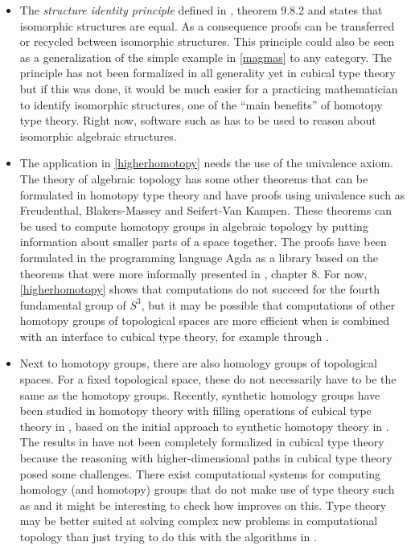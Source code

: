 \documentclass[12pt,a4paper,twoside,xetex]{book}
\newcommand{\keyword}[1]{\emph{#1}\index{#1}}
\begin{document}
\begin{itemize}
\item The \keyword{structure identity principle} defined in 
\cite{Voevodsky2013}, theorem 9.8.2 and \cite{Aczel2012} states that isomorphic 
structures are equal. As a consequence proofs can be transferred or recycled 
between isomorphic structures. This principle could also be seen as a 
generalization of the simple example in \cref{magmas} to any category. The 
principle has not been formalized in all generality yet in cubical type theory 
but if this was done, it would be much easier for a practicing mathematician to 
identify isomorphic structures, one of the ``main benefits'' of homotopy type 
theory. Right now, software such as \cite{TheGAPGroup2018} has to be used to 
reason about isomorphic algebraic structures.

\item The application in \cref{higherhomotopy} needs the use of the univalence 
axiom. The theory of algebraic topology has some other theorems that can be 
formulated in homotopy type theory and have proofs using univalence such as 
Freudenthal, Blakers-Massey and Seifert-Van Kampen. These theorems can be used 
to compute homotopy groups in algebraic topology by putting information about 
smaller parts of a space together. The proofs have been formulated in the 
programming language Agda as a library \cite{HoBr17} based on the theorems that 
were more informally presented in \cite{Voevodsky2013}, chapter 8. For now, 
\cref{higherhomotopy} shows that computations do not succeed for the fourth 
fundamental group of $S^3$, but it may be possible that computations of other 
homotopy groups of topological spaces are more efficient when \cite{HoBr17} is 
combined with an interface to cubical type theory, for example through 
\cite{Moertberg2018}.


\item Next to homotopy groups, there are also homology groups of topological 
spaces. For a fixed topological space, these do not necessarily have to be the 
same as the homotopy groups. Recently, synthetic homology groups have  been 
studied in homotopy theory with filling operations of cubical type theory in 
\cite{Graham2018}, based on the initial approach to synthetic homotopy theory in 
\cite{Licata2015}. The results in \cite{Graham2018} have not been completely 
formalized in cubical type theory because the reasoning with higher-dimensional 
paths in cubical type theory posed some challenges. There exist computational 
systems for computing homology  (and homotopy) groups that do not make use of 
type theory such as \cite{GaSeSi99} and it might be interesting to check how 
\cite{Graham2018} improves on this. Type theory may be better suited at solving 
complex new problems in computational topology than just trying to do this with 
the algorithms in \cite{GaSeSi99}.


\end{itemize}
\end{document}
